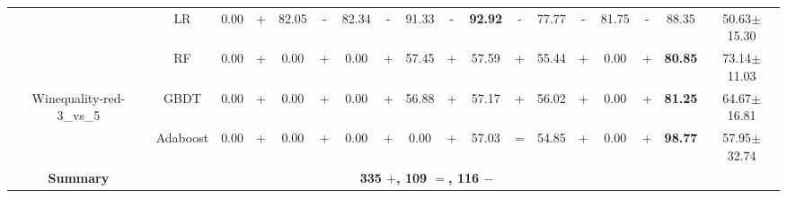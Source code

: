 \documentclass[journal]{IEEEtran}
\begin{document}
\begin{table*}
\begin{threeparttable}
\begin{tabular}{|c|c|cc|cc|cc|cc|cc|cc|cc|cc|}
			& LR    & 0.00  & +     & 82.05  & -     & 82.34  & -     & 91.33  & -     & \textbf{92.92}  & -     & 77.77  & -     & 81.75  & -     & 88.35  & 50.63$\pm$15.30  \\
			& RF    & 0.00  & +     & 0.00  & +     & 0.00  & +     & 57.45  & +     & 57.59  & +     & 55.44  & +     & 0.00  & +     & \textbf{80.85}  & 73.14$\pm$11.03  \\
			Winequality-red-3\_vs\_5
			& GBDT  & 0.00  & +     & 0.00  & +     & 0.00  & +     & 56.88  & +     & 57.17  & +     & 56.02  & +     & 0.00  & +     & \textbf{81.25}  & 64.67$\pm$16.81  \\
			& Adaboost & 0.00  & +     & 0.00  & +     & 0.00  & +     & 0.00  & +     & 57.03  & =     & 54.85  & +     & 0.00  & +     & \textbf{98.77}  & 57.95$\pm$32.74  \\
			\hline
			
			\textbf{Summary}   &\multicolumn{16}{c}{\textbf{335 $+$, 109 $=$, 116 $-$}}   &\\  \hline
		\end{tabular}%
		\label{gmean-results}
	\end{threeparttable}
\end{table*}
\end{document}
